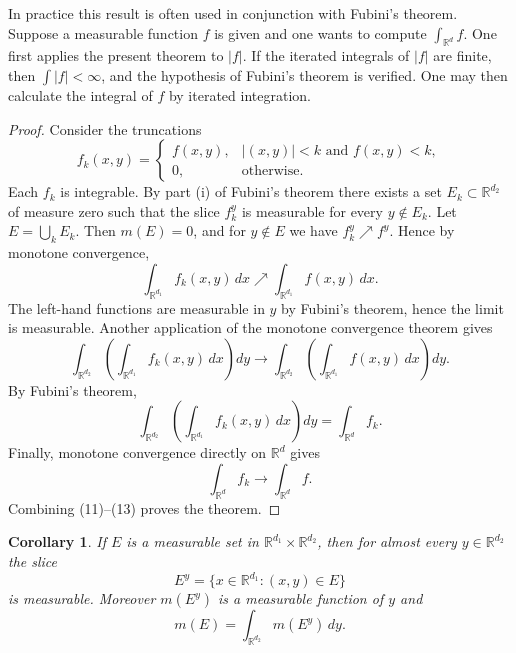 \documentclass[11pt,openany]{book}
\newtheorem{corollary}[theorem]{Corollary}
\begin{document}
In practice this result is often used in conjunction with Fubini's theorem. Suppose a measurable function $f$ is given and one wants to compute $\int_{\mathbb{R}^d}f$. One first applies the present theorem to $|f|$. If the iterated integrals of $|f|$ are finite, then $\int|f|<\infty$, and the hypothesis of Fubini's theorem is verified. One may then calculate the integral of $f$ by iterated integration.

\begin{proof}
Consider the truncations
\[
f_k(x,y)=
\begin{cases}
f(x,y),& |(x,y)|<k\text{ and }f(x,y)<k,\\
0,&\text{otherwise}.
\end{cases}
\]
Each $f_k$ is integrable. By part (i) of Fubini's theorem there exists a set $E_k\subset\mathbb{R}^{d_2}$ of measure zero such that the slice $f_k^y$ is measurable for every $y\notin E_k$. Let $E=\bigcup_kE_k$. Then $m(E)=0$, and for $y\notin E$ we have $f_k^y\nearrow f^y$. Hence by monotone convergence,
\[
\int_{\mathbb{R}^{d_1}}f_k(x,y)\,dx
\nearrow
\int_{\mathbb{R}^{d_1}}f(x,y)\,dx.
\]
The left-hand functions are measurable in $y$ by Fubini's theorem, hence the limit is measurable. Another application of the monotone convergence theorem gives
\begin{equation}
\int_{\mathbb{R}^{d_2}}
\left(\int_{\mathbb{R}^{d_1}}f_k(x,y)\,dx\right)dy
\longrightarrow
\int_{\mathbb{R}^{d_2}}
\left(\int_{\mathbb{R}^{d_1}}f(x,y)\,dx\right)dy.
\tag{11}
\end{equation}
By Fubini's theorem,
\begin{equation}
\int_{\mathbb{R}^{d_2}}
\left(\int_{\mathbb{R}^{d_1}}f_k(x,y)\,dx\right)dy
=\int_{\mathbb{R}^d}f_k.
\tag{12}
\end{equation}
Finally, monotone convergence directly on $\mathbb{R}^d$ gives
\begin{equation}
\int_{\mathbb{R}^d}f_k\longrightarrow\int_{\mathbb{R}^d}f.
\tag{13}
\end{equation}
Combining (11)--(13) proves the theorem.
\end{proof}

\begin{corollary}
If $E$ is a measurable set in $\mathbb{R}^{d_1}\times\mathbb{R}^{d_2}$, then for almost every $y\in\mathbb{R}^{d_2}$ the slice
\[
E^y=\{x\in\mathbb{R}^{d_1}:(x,y)\in E\}
\]
is measurable. Moreover $m(E^y)$ is a measurable function of $y$ and
\[
m(E)=\int_{\mathbb{R}^{d_2}}m(E^y)\,dy.
\]
\end{corollary}
\end{document}
